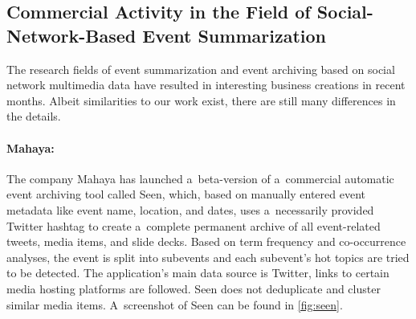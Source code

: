 \subsection{Commercial Activity in the Field of Social-Network-Based Event Summarization}

The research fields of event summarization and event archiving
based on social network multimedia data have resulted in 
interesting business creations in recent months.
Albeit similarities to our work exist,
there are still many differences in the details.

\paragraph{Mahaya:}
 
The company Mahaya has launched a~beta-version
of a~commercial automatic event archiving tool called Seen,
which, based on manually entered event metadata like event name,
location, and dates, uses a~necessarily provided Twitter hashtag
to create a~complete permanent archive of all event-related tweets,
media items, and slide decks.
Based on term frequency and co-occurrence analyses,
the event is split into subevents
and each subevent's hot topics are tried to be detected.
The application's main data source is Twitter,
links to certain media hosting platforms are followed.
Seen does not deduplicate and cluster
similar media items.
A~screenshot of Seen can be found in \autoref{fig:seen}.

